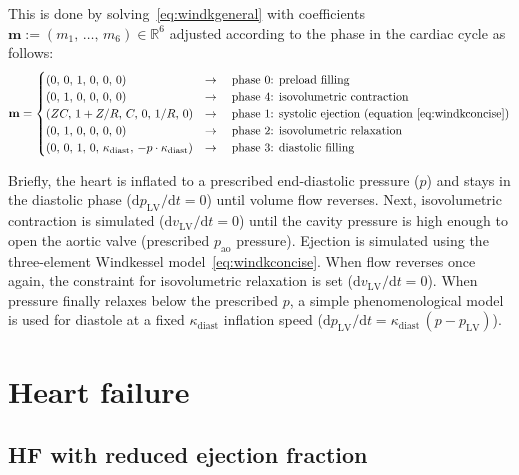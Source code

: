 \noindent
This is done by solving~\eqref{eq:windkgeneral} with coefficients  $\mathbf{m}:=(m_1,\,\dots,\,m_6)\in\mathbb{R}^6$ adjusted according to the phase in the cardiac cycle as follows:
%
\begin{equation}
    \mathbf{m} = \begin{cases}
    (0,\,0,\,1,\,0,\,0,\,0) & \rightarrow\quad\text{phase $0$: preload filling} \\
    (0,\,1,\,0,\,0,\,0,\,0) & \rightarrow\quad\text{phase $4$: isovolumetric contraction} \\
    (ZC,\,1+Z/R,\,C,\,0,\,1/R,\,0) & \rightarrow\quad\text{phase $1$: systolic ejection (equation~\eqref{eq:windkconcise})} \\
    (0,\,1,\,0,\,0,\,0,\,0) & \rightarrow\quad\text{phase $2$: isovolumetric relaxation} \\
    (0,\,0,\,1,\,0,\,\kappa_{\textrm{diast}},\,-p\cdot \kappa_{\textrm{diast}}) & \rightarrow\quad\text{phase $3$: diastolic filling}
    \end{cases}
\end{equation}

\noindent
Briefly, the heart is inflated to a prescribed end-diastolic pressure ($p$) and stays in the diastolic phase ($\textrm{d}p_{\textrm{LV}}/\textrm{d}t=0$) until volume flow reverses. Next, isovolumetric contraction is simulated ($\textrm{d}v_{\textrm{LV}}/\textrm{d}t=0$) until the cavity pressure is high enough to open the aortic valve (prescribed $p_{\textrm{ao}}$ pressure). Ejection is simulated using the three-element Windkessel model~\eqref{eq:windkconcise}. When flow reverses once again, the constraint for isovolumetric relaxation is set ($\textrm{d}v_{\textrm{LV}}/\textrm{d}t=0$). When pressure finally relaxes below the prescribed $p$, a simple phenomenological model is used for diastole at a fixed $\kappa_{\textrm{diast}}$ inflation speed ($\textrm{d}p_{\textrm{LV}}/\textrm{d}t=\kappa_{\textrm{diast}}\,(p - p_{\textrm{LV}})$).


%
%
%
\section{Heart failure}


%
%
%
\subsection{HF with reduced ejection fraction}

%
%
%
